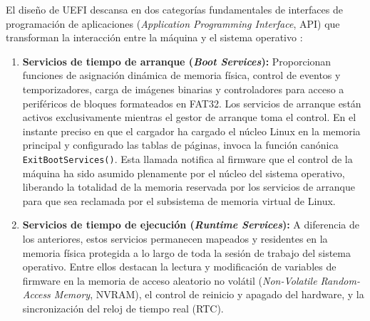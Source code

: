 \documentclass[12pt]{article}
\begin{document}
El diseño de UEFI descansa en dos categorías fundamentales de interfaces de programación de aplicaciones (\textit{Application Programming Interface}, API) que transforman la interacción entre la máquina y el sistema operativo \parencite{uefi2024specification}:
\begin{enumerate}[noitemsep, topsep=2pt]
    \item \textbf{Servicios de tiempo de arranque (\textit{Boot Services}):} Proporcionan funciones de asignación dinámica de memoria física, control de eventos y temporizadores, carga de imágenes binarias y controladores para acceso a periféricos de bloques formateados en FAT32. Los servicios de arranque están activos exclusivamente mientras el gestor de arranque toma el control. En el instante preciso en que el cargador ha cargado el núcleo Linux en la memoria principal y configurado las tablas de páginas, invoca la función canónica \texttt{ExitBootServices()}. Esta llamada notifica al firmware que el control de la máquina ha sido asumido plenamente por el núcleo del sistema operativo, liberando la totalidad de la memoria reservada por los servicios de arranque para que sea reclamada por el subsistema de memoria virtual de Linux.
    \item \textbf{Servicios de tiempo de ejecución (\textit{Runtime Services}):} A diferencia de los anteriores, estos servicios permanecen mapeados y residentes en la memoria física protegida a lo largo de toda la sesión de trabajo del sistema operativo. Entre ellos destacan la lectura y modificación de variables de firmware en la memoria de acceso aleatorio no volátil (\textit{Non-Volatile Random-Access Memory}, NVRAM), el control de reinicio y apagado del hardware, y la sincronización del reloj de tiempo real (RTC).
\end{enumerate}
\end{document}
